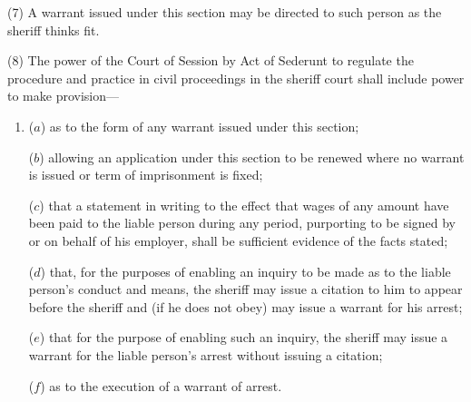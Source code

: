 \documentclass[a4paper]{article}
\begin{document}
(7) A warrant issued under this section may be directed to such person as the sheriff
thinks fit.

(8) The power of the Court of Session by Act of Sederunt to regulate the procedure
and practice in civil proceedings in the sheriff court shall include power to make
provision---
\begin{enumerate}\item[]
($a$) as to the form of any warrant issued under this section;

($b$) allowing an application under this section to be renewed where no warrant is
issued or term of imprisonment is fixed;

($c$) that a statement in writing to the effect that wages of any amount have been
paid to the liable person during any period, purporting to be signed by or on
behalf of his employer, shall be sufficient evidence of the facts stated;

($d$) that, for the purposes of enabling an inquiry to be made as to the liable
person’s conduct and means, the sheriff may issue a citation to him to appear
before the sheriff and (if he does not obey) may issue a warrant for his arrest;

($e$) that for the purpose of enabling such an inquiry, the sheriff may issue a
warrant for the liable person’s arrest without issuing a citation;

($f$) as to the execution of a warrant of arrest.
\end{enumerate}

\end{document}
